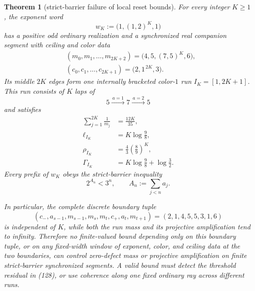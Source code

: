 \documentclass[11pt]{article}
\newtheorem{theorem}{Theorem}
\begin{document}
\begin{theorem}[strict-barrier failure of local reset bounds]
For every integer $K\geq1$, the exponent word
\[
  w_K:=\bigl(1,(1,2)^K,1\bigr)
\tag{136}
\]
has a positive odd ordinary realization and a synchronized real companion
segment with ceiling and color data
\[
\begin{aligned}
  &(m_0,m_1,\ldots,m_{2K+2})
    =\bigl(4,5,(7,5)^K,6\bigr),\\
  &(c_0,c_1,\ldots,c_{2K+1})
    =\bigl(2,1^{\,2K},3\bigr).
\end{aligned}
\tag{137}
\]
Its middle $2K$ edges form one internally bracketed color-$1$ run
$I_K=[1,2K+1]$.  This run consists of $K$ laps of
\[
  5\xrightarrow{\,a=1\,}7
   \xrightarrow{\,a=2\,}5
\tag{138}
\]
and satisfies
\[
\boxed{
\begin{aligned}
  \sum_{j=1}^{2K}\frac1{m_j}&=\frac{12K}{35},\\
  \ell_{I_K}&=K\log\frac98,\\
  \rho_{I_K}&=\frac43\left(\frac89\right)^K,\\
  \Gamma_{I_K}&=K\log\frac98+\log\frac32.
\end{aligned}}
\tag{139}
\]
Every prefix of $w_K$ obeys the strict-barrier inequality
\[
  2^{A_n}<3^n,
  \qquad
  A_n:=\sum_{j<n}a_j.
\tag{140}
\]

In particular, the complete discrete boundary tuple
\[
  (c_-,a_{s-1},m_{s-1},m_s,m_t,c_+,a_t,m_{t+1})
  =(2,1,4,5,5,3,1,6)
\tag{141}
\]
is independent of $K$, while both the run mass and its projective
amplification tend to infinity.  Therefore no finite-valued bound depending
only on this boundary tuple, or on any fixed-width window of exponent,
color, and ceiling data at the two boundaries, can control zero-defect
mass or projective amplification on finite strict-barrier synchronized
segments.  A valid bound must detect the threshold residual in (128), or
use coherence along one fixed ordinary ray across different runs.
\end{theorem}
\end{document}
